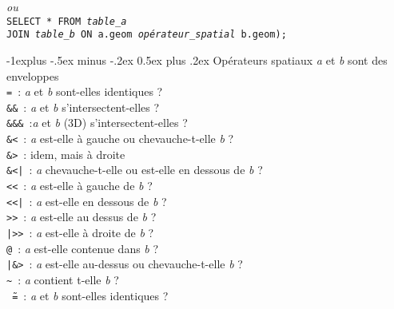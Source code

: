 \documentclass[10pt,landscape, a4paper]{article}
\makeatletter
\renewcommand{\subsection}{\@startsection{subsection}{2}{0mm}%
                                {-1explus -.5ex minus -.2ex}%
                                {0.5ex plus .2ex}%
                                {\normalfont\normalsize\bfseries}}
\makeatother
\begin{document}
\begin{multicols}{3}
 \hspace{0.25em} {\scriptsize \emph{ou}} \\
\texttt{SELECT * FROM \emph{table\_a} \\ JOIN \emph{table\_b} ON a.geom \emph{opérateur\_spatial} b.geom);}

\subsection{Opérateurs spatiaux}
 \hspace{0.25em} {\scriptsize\emph{a} et \emph{b} sont des enveloppes}\\
\texttt{=}~:  \emph{a} et \emph{b} sont-elles identiques ?\\ 

\texttt{\&\&}~: \emph{a} et \emph{b} s'intersectent-elles ?\\ 
\texttt{\&\&\&}~:\emph{a} et \emph{b} (3D) s'intersectent-elles ? \\ 
\texttt{\&<}~: \emph{a} est-elle à gauche ou chevauche-t-elle \emph{b}  ?\\ 
\texttt{\&>}~: idem, mais à droite\\
\texttt{\&<|}~: \emph{a} chevauche-t-elle ou est-elle en dessous de \emph{b}   ? \\
\texttt{<<}~: \emph{a} est-elle à gauche de \emph{b} ?\\ 
\texttt{<<|}~: \emph{a} est-elle en dessous de \emph{b} ?\\ 
\texttt{>>}~: \emph{a} est-elle au dessus de \emph{b} ?\\
\texttt{|>>}~: \emph{a} est-elle à droite de \emph{b} ?\\ 
\texttt{@}~:  \emph{a} est-elle contenue dans \emph{b} ?\\ 
\texttt{|\&>}~:  \emph{a} est-elle au-dessus ou chevauche-t-elle \emph{b}  ? \\ 
\texttt{\~}~: \emph{a} contient t-elle \emph{b}  ? \\ 
\texttt{\~\,=}~: \emph{a} et \emph{b} sont-elles identiques ?\\


\end{multicols}
\end{document}
